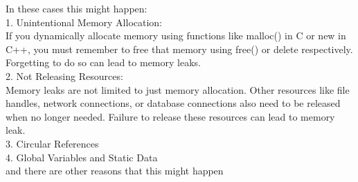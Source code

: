 \documentclass{article}
\begin{document}
In these cases this might happen:\\
1. Unintentional Memory Allocation:\\
If you dynamically allocate memory using functions like malloc() in C or new in C++, you must remember to free that memory using free() or delete respectively. Forgetting to do so can lead to memory leaks.\\
2. Not Releasing Resources:\\
Memory leaks are not limited to just memory allocation. Other resources like file handles, network connections, or database connections also need to be released when no longer needed. Failure to release these resources can lead to memory leak.\\
3. Circular References\\
4. Global Variables and Static Data\\
and there are other reasons that this might happen\\
\end{document}
